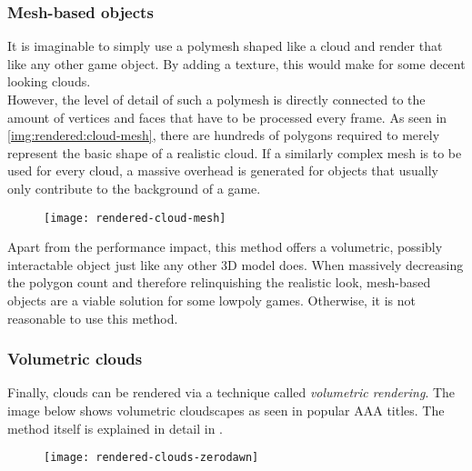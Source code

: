 \subsubsection{Mesh-based objects}
It is imaginable to simply use a \gls{polymesh} shaped like a cloud and render that like any other game object. By adding a texture, this would make for some decent looking clouds.
\\
However, the level of detail of such a polymesh is directly connected to the amount of vertices and faces that have to be processed every frame.
As seen in \autoref{img:rendered:cloud-mesh}, there are hundreds of polygons required to merely represent the basic shape of a realistic cloud.
If a similarly complex mesh is to be used for every cloud, a massive overhead is generated for objects that usually only contribute to the background of a game.
\begin{figure}[H]
    \centering
    \texttt{[image: rendered-cloud-mesh]}
    \label{img:rendered:cloud-mesh}
\end{figure}
\noindent
Apart from the performance impact, this method offers a volumetric, possibly interactable object just like any other 3D model does.
When massively decreasing the polygon count and therefore relinquishing the realistic look, mesh-based objects are a viable solution for some \gls{lowpoly} games.
Otherwise, it is not reasonable to use this method.

\subsubsection{Volumetric clouds}
Finally, clouds can be rendered via a technique called \textit{volumetric rendering}. The image below shows volumetric cloudscapes as seen in popular AAA titles.
The method itself is explained in detail in .

\begin{figure}[H]
    \centering
    \texttt{[image: rendered-clouds-zerodawn]}
    \label{img:rendered:clouds-zerodawn}
\end{figure}